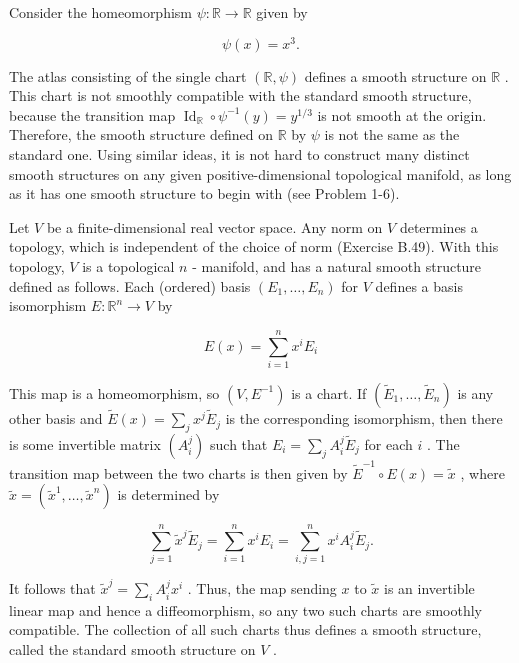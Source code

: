 \begin{example}
\label{ex:1-23}
\leanok
{}
Consider the homeomorphism $\psi  : \mathbb{R} \rightarrow  \mathbb{R}$ given by

\[
\psi \left( x\right)  = {x}^{3}. \tag{1.1}
\]

The atlas consisting of the single chart $\left( {\mathbb{R},\psi }\right)$ defines a smooth structure on $\mathbb{R}$ . This chart is not smoothly compatible with the standard smooth structure, because the transition map ${\operatorname{Id}}_{\mathbb{R}} \circ  {\psi }^{-1}\left( y\right)  = {y}^{1/3}$ is not smooth at the origin. Therefore, the smooth structure defined on $\mathbb{R}$ by $\psi$ is not the same as the standard one. Using similar ideas, it is not hard to construct many distinct smooth structures on any given positive-dimensional topological manifold, as long as it has one smooth structure to begin with (see Problem 1-6).
\end{example}

\begin{example}
\label{ex:1-24}
\leanok
{}
Let $V$ be a finite-dimensional real vector space. Any norm on $V$ determines a topology, which is independent of the choice of norm (Exercise B.49). With this topology, $V$ is a topological $n$ - manifold, and has a natural smooth structure defined as follows. Each (ordered) basis $\left( {{E}_{1},\ldots ,{E}_{n}}\right)$ for $V$ defines a basis isomorphism $E : {\mathbb{R}}^{n} \rightarrow  V$ by

\[
E\left( x\right)  = \mathop{\sum }\limits_{{i = 1}}^{n}{x}^{i}{E}_{i}
\]

This map is a homeomorphism, so $\left( {V,{E}^{-1}}\right)$ is a chart. If $\left( {{\widetilde{E}}_{1},\ldots ,{\widetilde{E}}_{n}}\right)$ is any other basis and $\widetilde{E}\left( x\right)  = \mathop{\sum }\limits_{j}{x}^{j}{\widetilde{E}}_{j}$ is the corresponding isomorphism, then there is some invertible matrix $\left( {A}_{i}^{j}\right)$ such that ${E}_{i} = \mathop{\sum }\limits_{j}{A}_{i}^{j}{\widetilde{E}}_{j}$ for each $i$ . The transition map between the two charts is then given by ${\widetilde{E}}^{-1} \circ  E\left( x\right)  = \widetilde{x}$ , where $\widetilde{x} = \left( {{\widetilde{x}}^{1},\ldots ,{\widetilde{x}}^{n}}\right)$ is determined by

\[
\mathop{\sum }\limits_{{j = 1}}^{n}{\widetilde{x}}^{j}{\widetilde{E}}_{j} = \mathop{\sum }\limits_{{i = 1}}^{n}{x}^{i}{E}_{i} = \mathop{\sum }\limits_{{i, j = 1}}^{n}{x}^{i}{A}_{i}^{j}{\widetilde{E}}_{j}.
\]

It follows that ${\widetilde{x}}^{j} = \mathop{\sum }\limits_{i}{A}_{i}^{j}{x}^{i}$ . Thus, the map sending $x$ to $\widetilde{x}$ is an invertible linear map and hence a diffeomorphism, so any two such charts are smoothly compatible. The collection of all such charts thus defines a smooth structure, called the standard smooth structure on $V$ .
\end{example}

